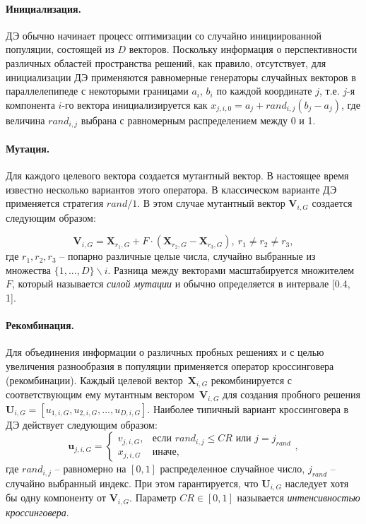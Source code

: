 \paragraph*{Инициализация.}

ДЭ обычно начинает процесс оптимизации со случайно инициированной популяции, состоящей из $D$ векторов.
Поскольку информация о перспективности различных областей пространства решений, как правило, отсутствует,
для инициализации ДЭ применяются равномерные генераторы случайных векторов в параллелепипеде с некоторыми
границами $a_i$, $b_i$ по каждой координате
$j$, т.е. $j$-я компонента $i$-го вектора
инициализируется как $x_{j, i, 0} = a_{j} + rand_{i,j}(b_j - a_j )$,
где величина $rand_{i,j}$ выбрана с равномерным распределением между 0 и 1.

\paragraph*{Мутация.}

Для каждого целевого вектора создается мутантный вектор. В настоящее время известно несколько вариантов этого оператора.
В классическом варианте ДЭ применяется стратегия $rand/1$. В этом случае мутантный вектор $\textbf{V}_{i,G}$ создается следующим
образом:

\begin{equation}\label{eq:de_mut}
  \textbf{V}_{i,G} = \textbf{X}_{r_1,G} + F \cdot (\textbf{X}_{r_2,G} - \textbf{X}_{r_3,G}), \ r_1 \neq r_2 \neq r_3,
\end{equation}
где $r_1, r_2, r_3 $ -- попарно различные целые числа, случайно выбранные из множества $\{1,...,D\}\backslash i$.
Разница между векторами масштабируется множителем $F$, который
называется {\em силой мутации} и обычно определяется в интервале [0.4, 1].

\paragraph*{Рекомбинация.}

Для объединения информации о различных пробных решениях и с целью увеличения разнообразия в популяции применяется оператор
кроссинговера (рекомбинации). Каждый целевой вектор~$\textbf{X}_{i,G}$ рекомбинируется с соответствующим ему мутантным
вектором~$\textbf{V}_{i,G}$ для создания пробного решения $\textbf{U}_{i,G} = [u_{1,i,G}, u_{2,i,G}, ..., u_{D,i,G}]$.
Наиболее типичный вариант кроссинговера в ДЭ действует следующим образом:
\begin{equation}\label{eq:de_crossover}
  \textbf{u}_{j,i,G} =
    \begin{cases}
     v_{j,i,G}, & \mbox{если~} rand_{i,j} \leq CR \mbox{~или~} j = j_{rand} \\
     x_{j,i,G} & \mbox{иначе},
    \end{cases},
\end{equation}
где $rand_{i,j}$ -- равномерно на $[0, 1]$ распределенное случайное число, $j_{rand}$ -- случайно выбранный индекс. При этом
гарантируется, что $\textbf{U}_{i,G}$ наследует хотя бы одну компоненту от $\textbf{V}_{i,G}$. Параметр
$CR \in [0, 1]$ называется {\em интенсивностью кроссинговера}.

